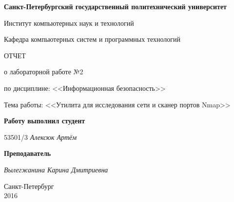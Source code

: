 \begin{titlepage}
\begin{center}

\textbf{Санкт-Петербургский государственный политехнический университет}

\vspace{5mm}
Институт компьютерных наук и технологий

\vspace{5mm}
Кафедра компьютерных систем и программных технологий

\vspace*{\fill}

\huge{ОТЧЕТ}

\Large{о лабораторной работе №2}
\vspace{2mm}

\large{по дисциплине: <<Информационная безопасность>>}

\vspace*{2mm}
\large{Тема работы: <<Утилита для исследования сети и сканер портов Nmap>>}

\vspace*{\fill}
\end{center}

\begin{large}
\hspace{0.35\linewidth} \textbf{Работу выполнил студент}

\vspace{5mm}
\hspace{0.35\linewidth} 53501/3 \hspace{1cm} \textit{Алексюк Артём}

\vspace{3mm}
\hspace{0.35\linewidth} \textbf{Преподаватель}

\vspace{5mm}
\hspace{0.35\linewidth} \underline{\hspace{2cm} } \hspace{3mm} \textit{Вылегжанина Карина Дмитриевна}
\end{large}

\vspace*{3cm}

\begin{center}
\normalsize Санкт-Петербург\\2016
\end{center}
\end{titlepage}